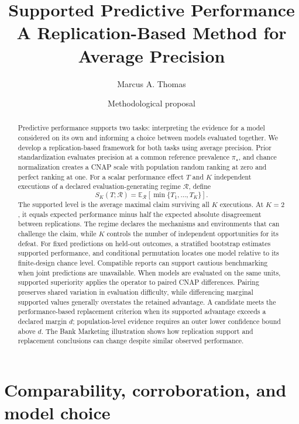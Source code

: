 \documentclass[11pt]{article}
\title{Supported Predictive Performance\\
\large A Replication-Based Method for Average Precision}
\author{Marcus A. Thomas}
\date{Methodological proposal}
\newcommand{\Regime}{\mathcal{R}}
\newcommand{\E}{\mathbb{E}}
\theoremstyle{remark}
\begin{document}
\maketitle

\begin{abstract}
Predictive performance supports two tasks: interpreting the evidence for a model considered on its own and informing a choice between models evaluated together. We develop a replication-based framework for both tasks using average precision. Prior standardization evaluates precision at a common reference prevalence $\pi_\star$, and chance normalization creates a CNAP scale with population random ranking at zero and perfect ranking at one. For a scalar performance effect $T$ and $K$ independent executions of a declared evaluation-generating regime $\Regime$, define
\[
S_K(T;\Regime)
=
\E_{\Regime}[\min\{T_1,\ldots,T_K\}].
\]
The supported level is the average maximal claim surviving all $K$ executions. At $K=2$, it equals expected performance minus half the expected absolute disagreement between replications. The regime declares the mechanisms and environments that can challenge the claim, while $K$ controls the number of independent opportunities for its defeat. For fixed predictions on held-out outcomes, a stratified bootstrap estimates supported performance, and conditional permutation locates one model relative to its finite-design chance level. Compatible reports can support cautious benchmarking when joint predictions are unavailable. When models are evaluated on the same units, supported superiority applies the operator to paired CNAP differences. Pairing preserves shared variation in evaluation difficulty, while differencing marginal supported values generally overstates the retained advantage. A candidate meets the performance-based replacement criterion when its supported advantage exceeds a declared margin $d$; population-level evidence requires an outer lower confidence bound above $d$. The Bank Marketing illustration shows how replication support and replacement conclusions can change despite similar observed performance.
\end{abstract}

\begingroup
\small
\setlength{\parskip}{0pt}
\tableofcontents
\endgroup
\newpage

\section{Comparability, corroboration, and model choice}
\label{sec:problems}
\end{document}
